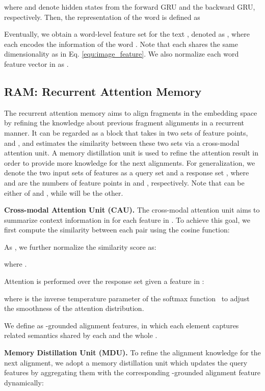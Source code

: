 \documentclass[10pt,twocolumn,letterpaper]{article}
\begin{document}
where  and  denote hidden states from the forward GRU and the backward GRU, respectively. Then, the representation of the word  is defined as 

Eventually, we obtain a word-level feature set for the text , denoted as , where each  encodes the information of the word . Note that each  shares the same dimensionality as  in Eq. \ref{equ:image_feature}. We also normalize each word feature vector in  as \cite{lee2018stacked}.

\subsection{RAM: Recurrent Attention Memory}
\label{sec:ram}
The recurrent attention memory aims to align fragments in the embedding space by refining the knowledge about previous fragment alignments in a recurrent manner. It can be regarded as a block that takes in two sets of feature points, \ie{}  and , and estimates the similarity between these two sets via a cross-modal attention unit. A memory distillation unit is used to refine the attention result in order to provide more knowledge for the next alignments. For generalization, we denote the two input sets of features as a query set  and a response set , where  and  are the numbers of feature points in  and , respectively. Note that  can be either of  and , while  will be the other. 

\textbf{Cross-modal Attention Unit (CAU).}
The cross-modal attention unit aims to summarize context information in  for each feature  in . To achieve this goal, we first compute the similarity between each pair  using the cosine function:

As \cite{lee2018stacked}, we further normalize the similarity score  as: 

where .

Attention is performed over the response set  given a feature  in :

where  is the inverse temperature parameter of the softmax function~\cite{chorowski2015attention} to adjust the smoothness of the attention distribution.

We define  as -grounded alignment features, in which each element captures related semantics shared by each  and the whole .

\textbf{Memory Distillation Unit (MDU).}
To refine the alignment knowledge for the next alignment, we adopt a memory distillation unit which updates the query features  by aggregating them with the corresponding -grounded alignment feature  dynamically:
\end{document}
